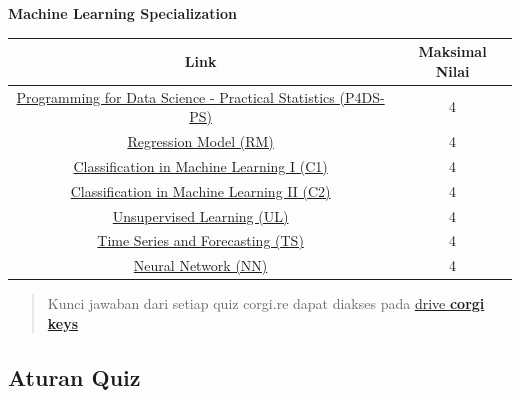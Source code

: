 \documentclass[
]{book}
\begin{document}
\textbf{Machine Learning Specialization}

\begin{longtable}[]{@{}cc@{}}
\toprule
\textbf{Link} & \textbf{Maksimal Nilai}\tabularnewline
\midrule
\endhead
\href{https://corgi.re/courses/Davidlimbong/P4DS-PS}{Programming for Data Science - Practical Statistics (P4DS-PS)} & 4\tabularnewline
\href{https://corgi.re/courses/ahmadhusain/regressionmodels}{Regression Model (RM)} & 4\tabularnewline
\href{https://corgi.re/courses/inytss/classification1}{Classification in Machine Learning I (C1)} & 4\tabularnewline
\href{https://corgi.re/courses/ysitta/Classification2}{Classification in Machine Learning II (C2)} & 4\tabularnewline
\href{https://corgi.re/courses/Davidlimbong/UnsupervisedLearning}{Unsupervised Learning (UL)} & 4\tabularnewline
\href{https://corgi.re/courses/inytss/time-series}{Time Series and Forecasting (TS)} & 4\tabularnewline
\href{https://corgi.re/courses/ysitta/Neural_Network}{Neural Network (NN)} & 4\tabularnewline
\bottomrule
\end{longtable}

\begin{quote}
Kunci jawaban dari setiap quiz corgi.re dapat diakses pada \href{https://drive.google.com/drive/folders/11wfxZ6DN2IVECOQNuKRN7ernT4ptKdev?usp=sharing}{drive \textbf{corgi keys}}
\end{quote}

\hypertarget{aturan-quiz}{%
\subsection{Aturan Quiz}\label{aturan-quiz}}
\end{document}

